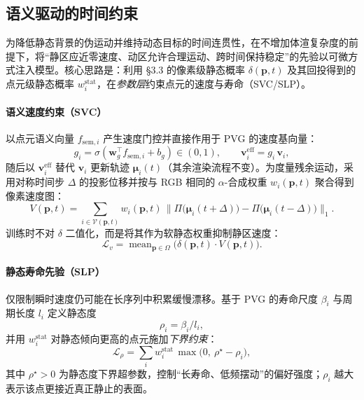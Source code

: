 \documentclass[10pt,conference]{IEEEtran} %
\begin{document}
\subsection{语义驱动的时间约束}
为降低静态背景的伪运动并维持动态目标的时间连贯性，在不增加体渲复杂度的前提下，将“静区应近零速度、动区允许合理运动、跨时间保持稳定”的先验以可微方式注入模型。核心思路是：利用 §3.3 的像素级静态概率 $\delta(\mathbf p,t)$ 及其回投得到的点元级静态概率 $w_i^{\mathrm{stat}}$，在\emph{参数层}约束点元的速度与寿命（SVC/SLP）。

\paragraph{语义速度约束（SVC）}
以点元语义向量 $f_{\mathrm{sem},i}$ 产生速度门控并直接作用于 PVG 的速度基向量：
\begin{equation}
g_i=\sigma(\mathbf w_g^\top f_{\mathrm{sem},i}+b_g)\in(0,1),\qquad
\bm{v}_i^{\mathrm{eff}}=g_i\,\bm{v}_i,
\label{eq:svc_gate}
\end{equation}
随后以 $\bm{v}_i^{\mathrm{eff}}$ 替代 $\bm{v}_i$ 更新轨迹 $\bm{\mu}_i(t)$（其余渲染流程不变）。为度量残余运动，采用对称时间步 $\Delta$ 的投影位移并按与 RGB 相同的 $\alpha$-合成权重 $w_i(\mathbf p,t)$ 聚合得到像素速度图：
\begin{equation}
V(\mathbf p,t)=\sum_{i\in\mathcal V(\mathbf p,t)} w_i(\mathbf p,t)\,
\big\|\Pi\!\big(\bm{\mu}_i(t+\Delta)\big)-\Pi\!\big(\bm{\mu}_i(t-\Delta)\big)\big\|_1 .
\label{eq:vel_map}
\end{equation}
训练时不对 $\delta$ 二值化，而是将其作为软静态权重抑制静区速度：
\begin{equation}
\mathcal L_{v}=\operatorname{mean}_{\mathbf p\in\Omega}\!\big(\delta(\mathbf p,t)\cdot V(\mathbf p,t)\big).
\label{eq:svc_loss}
\end{equation}

\paragraph{静态寿命先验（SLP）}
仅限制瞬时速度仍可能在长序列中积累缓慢漂移。基于 PVG 的寿命尺度 $\beta_i$ 与周期长度 $l_i$ 定义静态度
\begin{equation}
\rho_i=\beta_i/l_i,
\end{equation}
并用 $w_i^{\mathrm{stat}}$ 对静态倾向更高的点元施加\emph{下界约束}：
\begin{equation}
\mathcal L_{\rho}=\sum_{i} w_i^{\mathrm{stat}}\,
\max\!\big(0,\ \rho^\star-\rho_i\big),
\label{eq:slp_loss}
\end{equation}
其中 $\rho^\star>0$ 为静态度下界超参数，控制“长寿命、低频摆动”的偏好强度；$\rho_i$ 越大表示该点更接近真正静止的表面。
\end{document}
